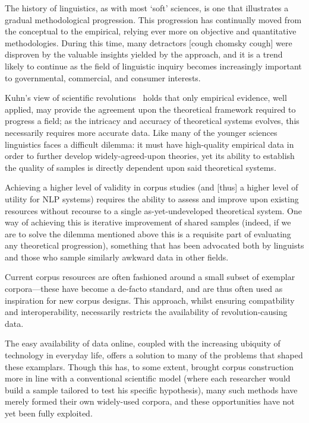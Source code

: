 
The history of linguistics, as with most `soft' sciences, is one that illustrates a gradual methodological progression.  This progression has continually moved from the conceptual to the empirical, relying ever more on objective and quantitative methodologies.  During this time, many detractors [cough chomsky cough] were disproven by the valuable insights yielded by the approach, and it is a trend likely to continue as the field of linguistic inquiry becomes increasingly important to governmental, commercial, and consumer interests.



Kuhn's view of scientific revolutions~\cite{kuhn1970structure}
holds that only empirical evidence, well applied, may provide the agreement upon the theoretical framework required to progress a field; as the intricacy and accuracy of theoretical systems evolves, this necessarily requires more accurate data.  Like many of the younger sciences linguistics faces a difficult dilemma: it must have high-quality empirical data in order to further develop widely-agreed-upon theories, yet its ability to establish the quality of samples is directly dependent upon said theoretical systems.


Achieving a higher level of validity in corpus studies (and [thus] a higher level of utility for NLP systems) requires the ability to assess and improve upon existing resources without recourse to a single as-yet-undeveloped theoretical system.
One way of achieving this is iterative improvement of shared samples (indeed, if we are to solve the dilemma mentioned above this is a requisite part of evaluating any theoretical progression), something that has been advocated both by linguists and those who sample similarly awkward data in other fields.


Current corpus resources are often fashioned around a small subset of exemplar corpora---these have become a de-facto standard, and are thus often used as inspiration for new corpus designs.  This approach, whilst ensuring compatbility and interoperability, necessarily restricts the availability of revolution-causing data.


The easy availability of data online, coupled with the increasing ubiquity of technology in everyday life, offers a solution to many of the problems that shaped these examplars.  Though this has, to some extent, brought corpus construction more in line with a conventional scientific model (where each researcher would build a sample tailored to test his specific hypothesis), many such methods have merely formed their own widely-used corpora, and these opportunities have not yet been fully exploited.


